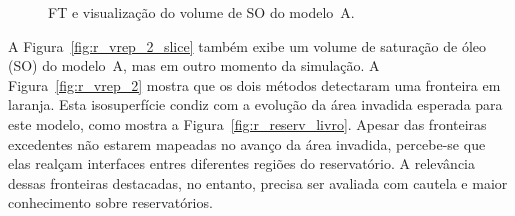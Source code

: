 \begin{figure}[h]
	\centering
	\caption{FT e visualização do volume de SO do modelo~A.}
	\label{fig:r_vrep}
\end{figure}

	A Figura~\ref{fig:r_vrep_2_slice} também exibe um volume de saturação de óleo (SO) do modelo~A, mas em outro momento da simulação. A Figura~\ref{fig:r_vrep_2} mostra que os dois métodos detectaram uma fronteira em laranja. Esta isosuperfície condiz com a evolução da área invadida esperada para este modelo, como mostra a Figura~\ref{fig:r_reserv_livro}. Apesar das fronteiras excedentes não estarem mapeadas no avanço da área invadida, percebe-se que elas realçam interfaces entres diferentes regiões do reservatório. A relevância dessas fronteiras destacadas, no entanto, precisa ser avaliada com cautela e maior conhecimento sobre reservatórios.
	
